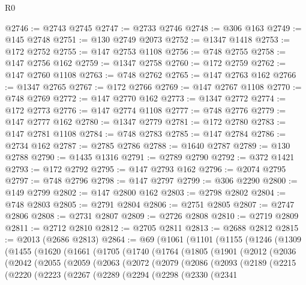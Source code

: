 \begin{lexlean}{R0}
\begin{coremodule}
@2746 := @2743 @2745
@2747 := @2733 @2746
@2748 := @306 @163
@2749 := @145 @2748
@2751 := @130 @2749 @2073
@2752 := @1347 @1418
@2753 := @172 @2752
@2755 := @147 @2753 @1108
@2756 := @748 @2755
@2758 := @147 @2756 @162
@2759 := @1347 @2758
@2760 := @172 @2759
@2762 := @147 @2760 @1108
@2763 := @748 @2762
@2765 := @147 @2763 @162
@2766 := @1347 @2765
@2767 := @172 @2766
@2769 := @147 @2767 @1108
@2770 := @748 @2769
@2772 := @147 @2770 @162
@2773 := @1347 @2772
@2774 := @172 @2773
@2776 := @147 @2774 @1108
@2777 := @748 @2776
@2779 := @147 @2777 @162
@2780 := @1347 @2779
@2781 := @172 @2780
@2783 := @147 @2781 @1108
@2784 := @748 @2783
@2785 := @147 @2784
@2786 := @2734 @162
@2787 := @2785 @2786
@2788 := @1640 @2787
@2789 := @130 @2788
@2790 := @1435 @1316
@2791 := @2789 @2790
@2792 := @372 @1421
@2793 := @172 @2792
@2795 := @147 @2793 @162
@2796 := @2074 @2795
@2797 := @748 @2796
@2798 := @147 @2797
@2799 := @306 @2290
@2800 := @149 @2799
@2802 := @147 @2800 @162
@2803 := @2798 @2802
@2804 := @748 @2803
@2805 := @2791 @2804
@2806 := @2751 @2805
@2807 := @2747 @2806
@2808 := @2731 @2807
@2809 := @2726 @2808
@2810 := @2719 @2809
@2811 := @2712 @2810
@2812 := @2705 @2811
@2813 := @2688 @2812
@2815 := @2013 (@2686 @2813)
@2864 := @69
    (@1061
      (@1101
        (@1155
          (@1246
            (@1309
              (@1455
                (@1620
                  (@1661
                    (@1705
                      (@1740
                        (@1764
                          (@1805
                            (@1901
                              (@2012
                                (@2036
                                  (@2042
                                    (@2055
                                      (@2059
                                        (@2063
                                          (@2072
                                            (@2079
                                              (@2086
                                                (@2093
                                                  (@2189
                                                    (@2215
                                                      (@2220
                                                        (@2223
                                                          (@2267
                                                            (@2289
                                                              (@2294
                                                                (@2298
                                                                  (@2330
                                                                    (@2341

\end{coremodule}
\end{lexlean}
